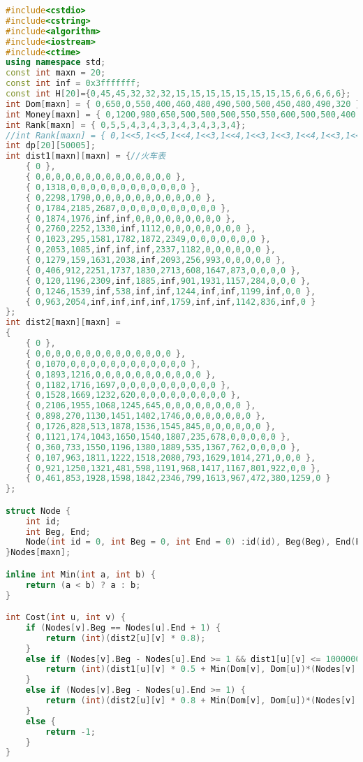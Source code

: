 \begin{lstlisting}[language=C++, numberstyle={\color{black!33}\tiny\sffamily}, basicstyle=\tiny]
#include<cstdio>
#include<cstring>
#include<algorithm>
#include<iostream>
#include<ctime>
using namespace std;
const int maxn = 20;
const int inf = 0x3fffffff;
const int H[20]={0,45,45,32,32,32,15,15,15,15,15,15,15,15,6,6,6,6,6};
int Dom[maxn] = { 0,650,0,550,400,460,480,490,500,500,450,480,490,320 };
int Money[maxn] = { 0,1200,980,650,500,500,500,550,550,600,500,500,400,650 };
int Rank[maxn] = { 0,5,5,4,3,4,3,3,4,3,4,3,3,4};
//int Rank[maxn] = { 0,1<<5,1<<5,1<<4,1<<3,1<<4,1<<3,1<<3,1<<4,1<<3,1<<4,1<<3,1<<3,1<<4};
int dp[20][50005];
int dist1[maxn][maxn] = {//火车表
	{ 0 },
	{ 0,0,0,0,0,0,0,0,0,0,0,0,0,0 },
	{ 0,1318,0,0,0,0,0,0,0,0,0,0,0,0 },
	{ 0,2298,1790,0,0,0,0,0,0,0,0,0,0,0 },
	{ 0,1784,2185,2687,0,0,0,0,0,0,0,0,0,0 },
	{ 0,1874,1976,inf,inf,0,0,0,0,0,0,0,0,0 },
	{ 0,2760,2252,1330,inf,1112,0,0,0,0,0,0,0,0 },
	{ 0,1023,295,1581,1782,1872,2349,0,0,0,0,0,0,0 },
	{ 0,2053,1085,inf,inf,inf,2337,1182,0,0,0,0,0,0 },
	{ 0,1279,159,1631,2038,inf,2093,256,993,0,0,0,0,0 },
	{ 0,406,912,2251,1737,1830,2713,608,1647,873,0,0,0,0 },
	{ 0,120,1196,2309,inf,1885,inf,901,1931,1157,284,0,0,0 },
	{ 0,1246,1539,inf,538,inf,inf,1244,inf,inf,1199,inf,0,0 },
	{ 0,963,2054,inf,inf,inf,inf,1759,inf,inf,1142,836,inf,0 }
};
int dist2[maxn][maxn] =
{
	{ 0 },
	{ 0,0,0,0,0,0,0,0,0,0,0,0,0,0 },
	{ 0,1070,0,0,0,0,0,0,0,0,0,0,0,0 },
	{ 0,1893,1216,0,0,0,0,0,0,0,0,0,0,0 },
	{ 0,1182,1716,1697,0,0,0,0,0,0,0,0,0,0 },
	{ 0,1528,1669,1232,620,0,0,0,0,0,0,0,0,0 },
	{ 0,2106,1955,1068,1245,645,0,0,0,0,0,0,0,0 },
	{ 0,898,270,1130,1451,1402,1746,0,0,0,0,0,0,0 },
	{ 0,1726,828,513,1878,1536,1545,845,0,0,0,0,0,0 },
	{ 0,1121,174,1043,1650,1540,1807,235,678,0,0,0,0,0 },
	{ 0,360,733,1550,1196,1380,1889,535,1367,762,0,0,0,0 },
	{ 0,107,963,1811,1222,1518,2080,793,1629,1014,271,0,0,0 },
	{ 0,921,1250,1321,481,598,1191,968,1417,1167,801,922,0,0 },
	{ 0,461,853,1928,1598,1842,2346,799,1613,967,472,380,1259,0 }
};

struct Node {
	int id;
	int Beg, End;
	Node(int id = 0, int Beg = 0, int End = 0) :id(id), Beg(Beg), End(End) {}
}Nodes[maxn];

inline int Min(int a, int b) {
	return (a < b) ? a : b;
}

int Cost(int u, int v) {
	if (Nodes[v].Beg == Nodes[u].End + 1) {
		return (int)(dist2[u][v] * 0.8);
	}
	else if (Nodes[v].Beg - Nodes[u].End >= 1 && dist1[u][v] <= 1000000) {
		return (int)(dist1[u][v] * 0.5 + Min(Dom[v], Dom[u])*(Nodes[v].Beg - Nodes[u].End - 1));
	}
	else if (Nodes[v].Beg - Nodes[u].End >= 1) {
		return (int)(dist2[u][v] * 0.8 + Min(Dom[v], Dom[u])*(Nodes[v].Beg - Nodes[u].End - 1));
	}
	else {
		return -1;
	}
}


\end{lstlisting}
